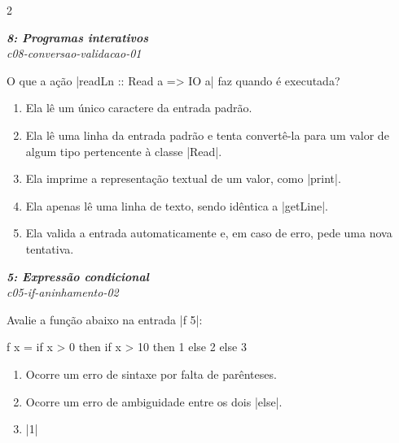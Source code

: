 \documentclass[a4paper,10pt,brazil]{article}
\begin{document}
\begin{multicols}{2}
\begin{flushright}
  \footnotesize
  \textit{\textbf{8: Programas interativos}}\\
  \textit{c08-conversao-validacao-01}\\

\end{flushright}
O que a ação \haskellinline|readLn :: Read a => IO a| faz quando é executada?

\begin{enumerate}
  \item Ela lê um único caractere da entrada padrão.

  \item Ela lê uma linha da entrada padrão e tenta convertê-la para um valor de algum tipo pertencente à classe \haskellinline|Read|.

  \item Ela imprime a representação textual de um valor, como \haskellinline|print|.

  \item Ela apenas lê uma linha de texto, sendo idêntica a \haskellinline|getLine|.

  \item Ela valida a entrada automaticamente e, em caso de erro, pede uma nova tentativa.


\end{enumerate}

\begin{flushright}
  \footnotesize
  \textit{\textbf{5: Expressão condicional}}\\
  \textit{c05-if-aninhamento-02}\\

\end{flushright}
Avalie a função abaixo na entrada \haskellinline|f 5|:
\begin{haskellcode}
f x = if x > 0
      then if x > 10
           then 1
           else 2
      else 3
\end{haskellcode}

\begin{enumerate}
  \item Ocorre um erro de sintaxe por falta de parênteses.

  \item Ocorre um erro de ambiguidade entre os dois \haskellinline|else|.

  \item \haskellinline|1|


\end{enumerate}
\end{multicols}
\end{document}
